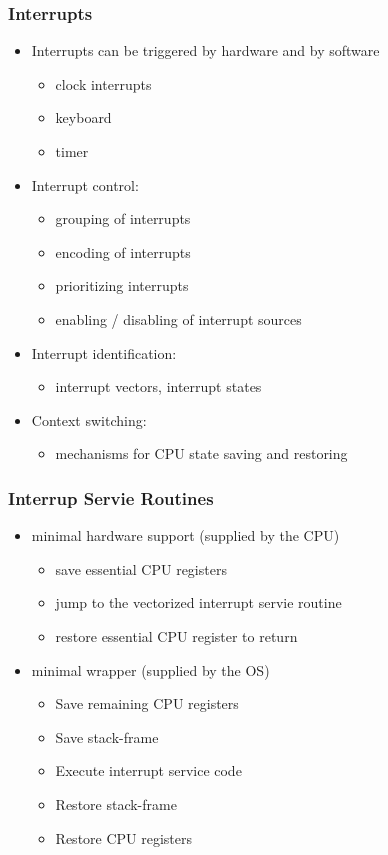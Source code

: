 \documentclass[11pt]{article}
\begin{document}
\subsubsection{Interrupts}
\label{sec:org014d943}
\begin{itemize}
\item Interrupts can be triggered by hardware and by software
\begin{itemize}
\item clock interrupts
\item keyboard
\item timer
\end{itemize}
\item Interrupt control:
\begin{itemize}
\item grouping of interrupts
\item encoding of interrupts
\item prioritizing interrupts
\item enabling / disabling of interrupt sources
\end{itemize}
\item Interrupt identification:
\begin{itemize}
\item interrupt vectors, interrupt states
\end{itemize}
\item Context switching:
\begin{itemize}
\item mechanisms for CPU state saving and restoring
\end{itemize}
\end{itemize}
\subsubsection{Interrup Servie Routines}
\label{sec:orgd703584}
\begin{itemize}
\item minimal hardware support (supplied by the CPU)
\begin{itemize}
\item save essential CPU registers
\item jump to the vectorized interrupt servie routine
\item restore essential CPU register to return
\end{itemize}
\item minimal wrapper (supplied by the OS)
\begin{itemize}
\item Save remaining CPU registers
\item Save stack-frame
\item Execute interrupt service code
\item Restore stack-frame
\item Restore CPU registers
\end{itemize}
\end{itemize}
\end{document}
